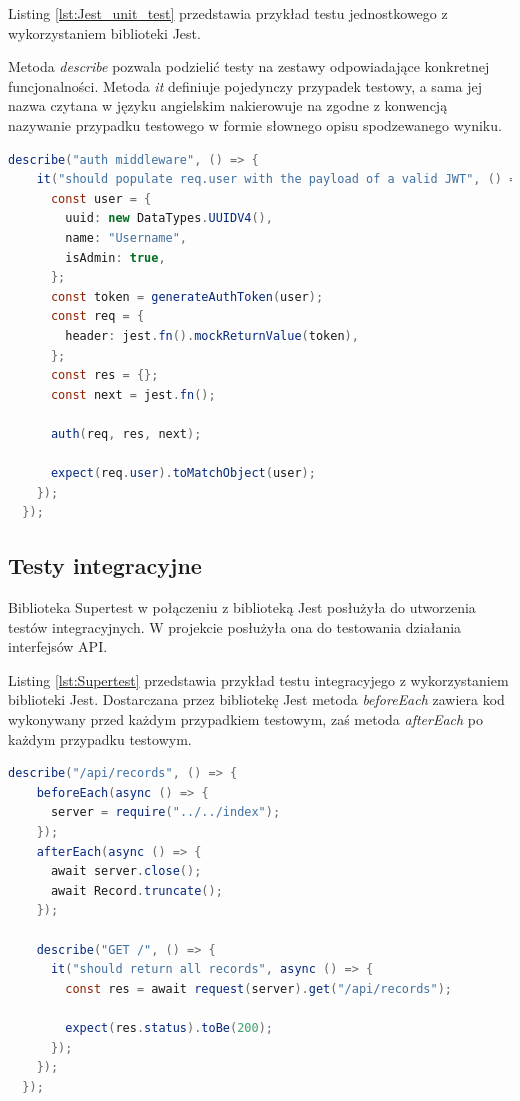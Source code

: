 \documentclass{sprz}
\begin{document}
Listing \ref{lst:Jest_unit_test} przedstawia przykład testu jednostkowego z wykorzystaniem biblioteki Jest.

Metoda \textit{describe} pozwala podzielić testy na zestawy odpowiadające konkretnej funcjonalności. Metoda \textit{it} definiuje pojedynczy przypadek testowy, a sama jej nazwa czytana w języku angielskim nakierowuje na zgodne z konwencją nazywanie przypadku testowego w formie słownego opisu spodzewanego wyniku.

\begin{lstlisting}[language=Java,caption={Test jednostkowy z wykorzystaniem Jest}, label={lst:Jest_unit_test}]
  describe("auth middleware", () => {
    it("should populate req.user with the payload of a valid JWT", () => {
      const user = {
        uuid: new DataTypes.UUIDV4(),
        name: "Username",
        isAdmin: true,
      };
      const token = generateAuthToken(user);
      const req = {
        header: jest.fn().mockReturnValue(token),
      };
      const res = {};
      const next = jest.fn();
  
      auth(req, res, next);
  
      expect(req.user).toMatchObject(user);
    });
  });
\end{lstlisting}

\subsection{Testy integracyjne}

Biblioteka Supertest w połączeniu z biblioteką Jest posłużyła do utworzenia testów integracyjnych. W projekcie posłużyła ona do testowania działania interfejsów API.

Listing \ref{lst:Supertest} przedstawia przykład testu integracyjego z wykorzystaniem biblioteki Jest. Dostarczana przez bibliotekę Jest metoda \textit{beforeEach} zawiera kod wykonywany przed każdym przypadkiem testowym, zaś metoda \textit{afterEach} po każdym przypadku testowym.

\begin{lstlisting}[language=Java,caption={Test integracyjny z wykorzystaniem Supertest i Jest}, label={lst:Supertest}]
  describe("/api/records", () => {
    beforeEach(async () => {
      server = require("../../index");
    });
    afterEach(async () => {
      await server.close();
      await Record.truncate();
    });
  
    describe("GET /", () => {
      it("should return all records", async () => {
        const res = await request(server).get("/api/records");
  
        expect(res.status).toBe(200);
      });
    });
  });
\end{lstlisting}
\end{document}
